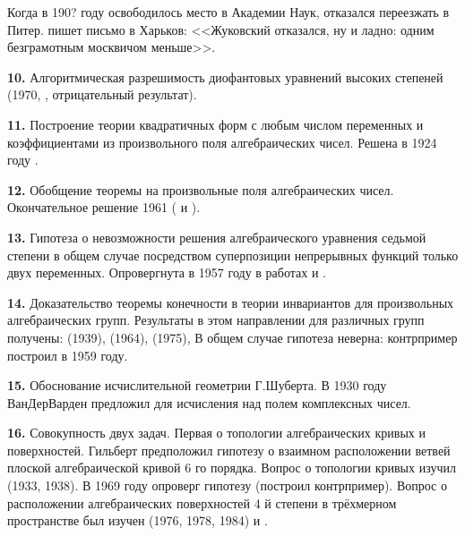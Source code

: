 \documentclass[a4paper,oneside,fleqn,10pt]{article}
\begin{document}
Когда в 190? году освободилось место в Академии Наук, 
отказался переезжать в Питер.   пишет письмо
 в Харьков: <<Жуковский отказался, ну и
ладно: одним безграмотным москвичом меньше>>.

\medskip

\textbf{10.} Алгоритмическая разрешимость диофантовых уравнений
высоких степеней (1970, , отрицательный
результат).

\medskip

\textbf{11.} Построение теории квадратичных форм с любым числом
переменных и коэффициентами из произвольного поля алгебраических
чисел. Решена в 1924 году .

\medskip

\textbf{12.} Обобщение теоремы 
 на произвольные поля алгебраических чисел.
Окончательное решение 1961 ( и ).

\medskip

\textbf{13.} Гипотеза о невозможности решения алгебраического
уравнения седьмой степени в общем случае посредством суперпозиции
непрерывных функций только двух переменных.  Опровергнута в 1957 году
в работах  и .

\medskip

\textbf{14.} Доказательство теоремы конечности в теории инвариантов
для произвольных алгебраических групп. Результаты в этом направлении
для различных групп получены:  (1939),
 (1964),  (1975), В общем случае
гипотеза неверна: контрпример построил  в 1959 году.

\medskip

\textbf{15.} Обоснование исчислительной геометрии Г.Шуберта. В 1930
году ВанДерВарден предложил для исчисления над полем комплексных
чисел.

\medskip

\textbf{16.} Совокупность двух задач. Первая о топологии
алгебраических кривых и поверхностей. Гильберт предположил гипотезу о
взаимном расположении ветвей плоской алгебраической кривой 6 го
порядка.  Вопрос о топологии кривых изучил 
(1933, 1938).  В 1969 году  опроверг гипотезу
(построил контрпример).  Вопрос о расположении алгебраических
поверхностей 4 й степени в трёхмерном пространстве был изучен
 (1976, 1978, 1984) и
.
\end{document}
